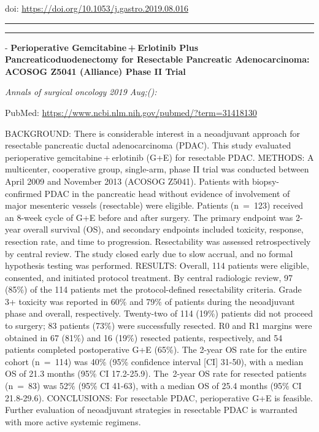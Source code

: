 \documentclass[]{article}
\begin{document}
doi: \url{https://doi.org/10.1053/j.gastro.2019.08.016}

{}

{}

\begin{center}\rule{0.5\linewidth}{\linethickness}\end{center}

\begin{center}\rule{0.5\linewidth}{\linethickness}\end{center}

 - \textbf{Perioperative Gemcitabine + Erlotinib Plus
Pancreaticoduodenectomy for Resectable Pancreatic Adenocarcinoma: ACOSOG
Z5041 (Alliance) Phase II Trial}

\emph{Annals of surgical oncology 2019 Aug;():}

PubMed: \url{https://www.ncbi.nlm.nih.gov/pubmed/?term=31418130}

BACKGROUND: There is considerable interest in a neoadjuvant approach for
resectable pancreatic ductal adenocarcinoma (PDAC). This study evaluated
perioperative gemcitabine + erlotinib (G+E) for resectable PDAC.
METHODS: A multicenter, cooperative group, single-arm, phase II trial
was conducted between April 2009 and November 2013 (ACOSOG Z5041).
Patients with biopsy-confirmed PDAC in the pancreatic head without
evidence of involvement of major mesenteric vessels (resectable) were
eligible. Patients (n~=~123) received an 8-week cycle of G+E before and
after surgery. The primary endpoint was 2-year overall survival (OS),
and secondary endpoints included toxicity, response, resection rate, and
time to progression. Resectability was assessed retrospectively by
central review. The study closed early due to slow accrual, and no
formal hypothesis testing was performed. RESULTS: Overall, 114 patients
were eligible, consented, and initiated protocol treatment. By central
radiologic review, 97 (85\%) of the 114 patients met the
protocol-defined resectability criteria. Grade 3+ toxicity was reported
in 60\% and 79\% of patients during the neoadjuvant phase and overall,
respectively. Twenty-two of 114 (19\%) patients did not proceed to
surgery; 83 patients (73\%) were successfully resected. R0 and R1
margins were obtained in 67 (81\%) and 16 (19\%) resected patients,
respectively, and 54 patients completed postoperative G+E (65\%). The
2-year OS rate for the entire cohort (n~=~114) was 40\% (95\% confidence
interval {[}CI{]} 31-50), with a median OS of 21.3 months (95\% CI
17.2-25.9). The~2-year OS rate for resected patients (n~=~83) was 52\%
(95\% CI 41-63), with a median OS of 25.4 months (95\% CI 21.8-29.6).
CONCLUSIONS: For resectable PDAC, perioperative G+E is feasible. Further
evaluation of neoadjuvant strategies in resectable PDAC is warranted
with more active systemic regimens.
\end{document}
